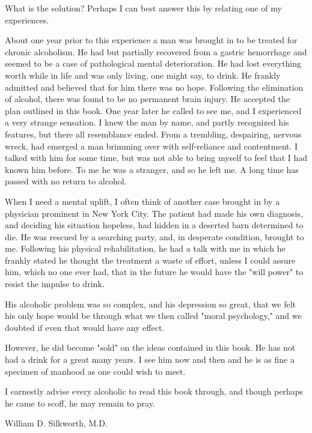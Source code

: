 \begin{biblechapter}
    What is the solution? 
\verse Perhaps I can best answer this by relating one of my experiences.

\verse About one year prior to this experience 
    a man was brought in to be treated for chronic alcoholism. 
\verse He had but partially recovered from a gastric hemorrhage 
    and seemed to be a case of pathological mental deterioration. 
\verse He had lost everything worth while in life 
    and was only living, one might say, to drink. 
\verse He frankly admitted and believed that for him there was no hope. 
\verse Following the elimination of alcohol, there was found to be no permanent brain injury. 
\verse He accepted the plan outlined in this book. 
\verse One year later he called to see me, and I experienced a very strange sensation. 
\verse I knew the man by name, and partly recognized his features, 
    but there all resemblance ended. 
\verse From a trembling, despairing, nervous wreck, 
    had emerged a man brimming over with self-reliance and contentment. 
\verse I talked with him for some time, 
    but was not able to bring myself to feel that I had known him before. 
\verse To me he was a stranger, and so he left me. 
\verse A long time has passed with no return to alcohol.

\verse When I need a mental uplift, 
    I often think of another case brought in by a physician prominent in New York City. 
\verse The patient had made his own diagnosis, 
    and deciding his situation hopeless, 
    had hidden in a deserted barn determined to die. 
\verse He was rescued by a searching party, 
    and, in desperate condition, brought to me. 
\verse Following his physical rehabilitation, 
    he had a talk with me in which he frankly stated he thought the treatment a waste of effort, 
    unless I could assure him, which no one ever had, 
    that in the future he would have the "will power" to resist the impulse to drink.

\verse His alcoholic problem was so complex, 
    and his depression so great, 
    that we felt his only hope would be through what we then called "moral psychology," 
    and we doubted if even that would have any effect.

\verse However, he did become "sold" on the ideas contained in this book. 
\verse He has not had a drink for a great many years. 
\verse I see him now and then and he is as fine a specimen of manhood as one could wish to meet.

\verse I earnestly advise every alcoholic to read this book through, 
    and though perhaps he came to scoff, 
    he may remain to pray.

\verse William D. Silkworth, M.D.
\end{biblechapter}
